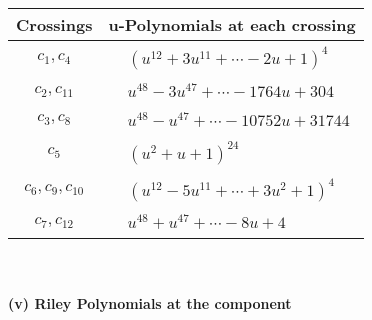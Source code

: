 \documentclass[1p]{elsarticle_modified}
\theoremstyle{definition}
\begin{document}
\begin{tabular}{m{50pt}|m{274pt}}
Crossings & \hspace{64pt}u-Polynomials at each crossing \\
\hline $$\begin{aligned}c_{1},c_{4}\end{aligned}$$&$\begin{aligned}
&(u^{12}+3 u^{11}+\cdots-2 u+1)^{4}
\end{aligned}$\\
\hline $$\begin{aligned}c_{2},c_{11}\end{aligned}$$&$\begin{aligned}
&u^{48}-3 u^{47}+\cdots-1764 u+304
\end{aligned}$\\
\hline $$\begin{aligned}c_{3},c_{8}\end{aligned}$$&$\begin{aligned}
&u^{48}- u^{47}+\cdots-10752 u+31744
\end{aligned}$\\
\hline $$\begin{aligned}c_{5}\end{aligned}$$&$\begin{aligned}
&(u^2+u+1)^{24}
\end{aligned}$\\
\hline $$\begin{aligned}c_{6},c_{9},c_{10}\end{aligned}$$&$\begin{aligned}
&(u^{12}-5 u^{11}+\cdots+3 u^2+1)^{4}
\end{aligned}$\\
\hline $$\begin{aligned}c_{7},c_{12}\end{aligned}$$&$\begin{aligned}
&u^{48}+u^{47}+\cdots-8 u+4
\end{aligned}$\\
\hline
\end{tabular}\\~\\
\newpage\renewcommand{\arraystretch}{1}
\flushleft \textbf{(v) Riley Polynomials at the component}\newline \\
\end{document}

